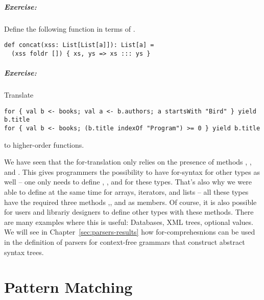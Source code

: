 \documentclass[11pt]{report}
\newcommand{\exercise}{\paragraph{Exercise:}}
\begin{document}
\exercise
Define the following function in terms of \verb@for@.
\begin{verbatim}
def concat(xss: List[List[a]]): List[a] =
  (xss foldr []) { xs, ys => xs ::: ys }
\end{verbatim}
\exercise
Translate
\begin{verbatim}
for { val b <- books; val a <- b.authors; a startsWith "Bird" } yield b.title
for { val b <- books; (b.title indexOf "Program") >= 0 } yield b.title
\end{verbatim}
to higher-order functions.

We have seen that the for-translation only relies on the presence of
methods \verb@map@,
\verb@flatMap@, and \verb@filter@.
This gives programmers the possibility to have for-syntax for
other types as well -- one only needs to define \verb@map@,
\verb@flatMap@, and \verb@filter@ for these types.
That's also why we were able to define \verb@for@ at the same time for
arrays, iterators, and lists -- all these types have the required
three methods \verb@map@,\verb@flatMap@, and \verb@filter@ as members.
Of course, it is also possible for users and librariy designers to
define other types with these methods. There are many examples where
this is useful: Databases, XML trees, optional values. We will see in
Chapter~\ref{sec:parsers-results} how for-comprehesnions can be used in the
definition of parsers for context-free grammars that construct
abstract syntax trees.

\chapter{\label{sec:simple-examples}Pattern Matching}

\end{document}

